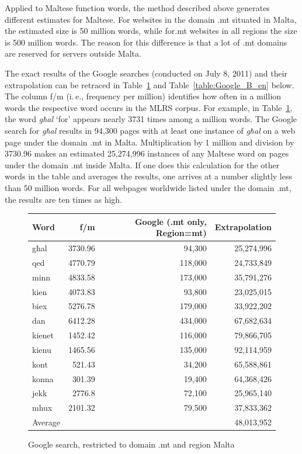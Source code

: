 \documentclass[]{../../metanetpaper}
\begin{document}
\begin{multicols}{2}
Applied to Maltese function words, the method described above generates different estimates for Maltese. For websites in the domain .mt situated in Malta, the estimated size is 50 million words, while for.mt websites in all regions the size is 500 million words. The reason for this difference is that a lot of .mt domains are reserved for servers outside Malta.

The exact results of the Google searches (conducted on July 8, 2011) and their extrapolation can be retraced in Table~\ref{table:Google_A_en} and Table~\ref{table:Google_B_en} below. The column f/m (i.\,e., frequency per million) identifies how often in a million words the respective word occurs in the MLRS corpus. For example, in Table~\ref{table:Google_A_en}, the word \emph{għal} `for’ appears nearly 3731 times among a million words. The Google search for \emph{għal} results in 94,300 pages with at least one instance of \emph{għal} on a web page under the domain .mt in Malta. Multiplication by 1 million and division by 3730.96 makes an estimated 25,274,996 instances of any Maltese word on pages under the domain .mt inside Malta. If one does this calculation for the other words in the table and averages the results, one arrives at a number slightly less than 50 million words. For all webpages worldwide listed under the domain .mt, the results are ten times as high.

\begin{figure}[tb]
\setlength{\tabcolsep}{2.5em}
\begin{tabularx}{\textwidth}{lrrr} \toprule\addlinespace
Word & f/m & Google (.mt only, Region=mt) &  Extrapolation \\
\hline
għal & 3730.96 & 94,300 & 25,274,996 \\
qed	& 4770.79 & 118,000 & 24,733,849 \\
minn & 4833.58 & 173,000 & 35,791,276 \\
kien & 4073.83 & 93,800 & 23,025,015 \\
biex & 5276.78 & 179,000 & 33,922,202 \\
dan	& 6412.28 & 434,000 & 67,682,634 \\
kienet & 1452.42 & 116,000 & 79,866,705 \\
kienu & 1465.56 & 135,000 & 92,114,959 \\
kont & 521.43 & 34,200 & 65,588,861 \\
konna & 301.39 & 19,400 & 64,368,426 \\
jekk & 2776.8 & 72,100 & 25,965,140 \\
mhux & 2101.32 & 79,500 & 37,833,362 \\
\hline
Average& & & 48,013,952 \\
\hline
\end{tabularx}
\caption{Google search, restricted to domain .mt and region Malta}
\label{table:Google_A_en}
\end{figure}


\end{multicols}
\end{document}
